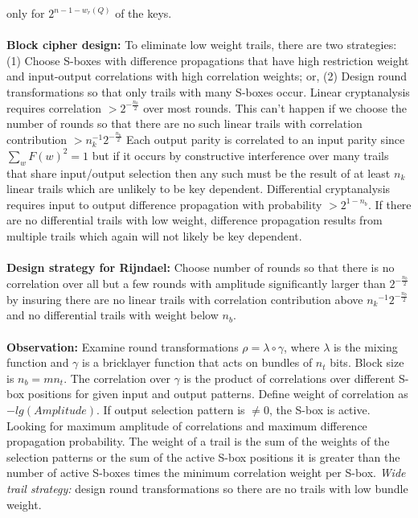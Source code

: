 only for $2^{n-1-w_r(Q)}$ of the keys.
\\
\\
{\bf Block cipher design:} To eliminate low weight trails,
there are two strategies: (1) Choose S-boxes with difference propagations that have high
restriction weight and input-output correlations with high correlation weights; or,
(2) Design round transformations so that only trails with many S-boxes occur.
Linear
cryptanalysis requires correlation $> 2^{- {\frac {n_b} 2}}$ over most rounds.
This can't happen if we choose the number of rounds so that there are no such linear
trails with correlation contribution $>n_k^{-1} 2^{- {\frac {n_b} 2}}$
Each output
parity is correlated to an input parity since $\sum_w F(w)^2=1$ but if it occurs by
constructive interference over many trails that share input/output selection then any such 
must be the result of at least $n_k$ linear trails which are unlikely to be key dependent.
Differential cryptanalysis requires input to output difference propagation with
probability $>2^{1-n_b}$.  If there are no differential trails with low weight,
difference propagation results from multiple trails which again will not 
likely be key dependent.
\\
\\
{\bf Design strategy for Rijndael:}
Choose number of rounds so that there is no correlation
over all but a few rounds with amplitude significantly 
larger than $2^{- {\frac {n_b} 2}}$ by insuring there are no 
linear trails with correlation contribution above ${n_k}^{-1} 2^{- {\frac {n_b} 2}}$
and no differential trails with weight below $n_b$.
\\
\\
{\bf Observation:}
Examine round transformations $\rho= \lambda \circ \gamma$, where
$\lambda$ is the mixing function and $\gamma$ is a bricklayer function that
acts on bundles of $n_t$ bits.  Block size is $n_b=m n_t$.  The correlation over
$\gamma$ is the product of correlations over different S-box positions for
given input and output patterns.  Define weight of correlation as $-lg(Amplitude)$.
If output selection pattern is $\ne 0$, the S-box is active.  Looking for maximum
amplitude of correlations and maximum difference propagation probability.
The weight of a trail is the sum of the weights of the selection patterns or the
sum of the active S-box positions it is greater than the number of active S-boxes times
the minimum correlation weight per S-box.  \emph{Wide trail strategy:} design round transformations
so there are no trails with low bundle weight.
